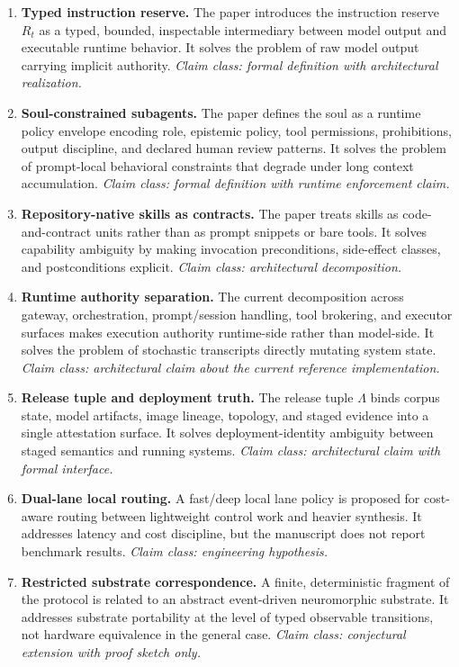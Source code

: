 \documentclass[11pt]{article}
\theoremstyle{remark}
\begin{document}
\begin{enumerate}[leftmargin=1.5em, itemsep=0.5em]
    \item \textbf{Typed instruction reserve.} The paper introduces the instruction reserve \(R_t\) as a typed, bounded, inspectable intermediary between model output and executable runtime behavior. It solves the problem of raw model output carrying implicit authority. \emph{Claim class: formal definition with architectural realization.}
    \item \textbf{Soul-constrained subagents.} The paper defines the soul as a runtime policy envelope encoding role, epistemic policy, tool permissions, prohibitions, output discipline, and declared human review patterns. It solves the problem of prompt-local behavioral constraints that degrade under long context accumulation. \emph{Claim class: formal definition with runtime enforcement claim.}
    \item \textbf{Repository-native skills as contracts.} The paper treats skills as code-and-contract units rather than as prompt snippets or bare tools. It solves capability ambiguity by making invocation preconditions, side-effect classes, and postconditions explicit. \emph{Claim class: architectural decomposition.}
    \item \textbf{Runtime authority separation.} The current decomposition across gateway, orchestration, prompt/session handling, tool brokering, and executor surfaces makes execution authority runtime-side rather than model-side. It solves the problem of stochastic transcripts directly mutating system state. \emph{Claim class: architectural claim about the current reference implementation.}
    \item \textbf{Release tuple and deployment truth.} The release tuple \(\Lambda\) binds corpus state, model artifacts, image lineage, topology, and staged evidence into a single attestation surface. It solves deployment-identity ambiguity between staged semantics and running systems. \emph{Claim class: architectural claim with formal interface.}
    \item \textbf{Dual-lane local routing.} A fast/deep local lane policy is proposed for cost-aware routing between lightweight control work and heavier synthesis. It addresses latency and cost discipline, but the manuscript does not report benchmark results. \emph{Claim class: engineering hypothesis.}
    \item \textbf{Restricted substrate correspondence.} A finite, deterministic fragment of the protocol is related to an abstract event-driven neuromorphic substrate. It addresses substrate portability at the level of typed observable transitions, not hardware equivalence in the general case. \emph{Claim class: conjectural extension with proof sketch only.}
\end{enumerate}
\end{document}
